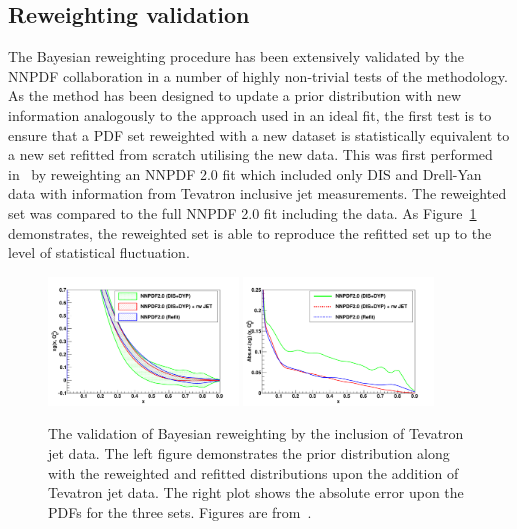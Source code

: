 \subsection{Reweighting validation}
The Bayesian reweighting procedure has been extensively validated by the NNPDF collaboration in a number of highly non-trivial tests of the methodology. As the method has been designed to update a prior distribution with new information analogously to the approach used in an ideal fit, the first test is to ensure that a PDF set reweighted with a new dataset is statistically equivalent to a new set refitted from scratch utilising the new data. This was first performed in~\cite{Ball:2010gb} by reweighting an NNPDF 2.0 fit which included only DIS and Drell-Yan data with information from Tevatron inclusive jet measurements. The reweighted set was compared to the full NNPDF 2.0 fit including the data. As Figure~\ref{fig:rwvalid} demonstrates, the reweighted set is able to reproduce the refitted set up to the level of statistical fluctuation.


\begin{figure}[ht!]
\centering
\includegraphics[width=0.45\textwidth]{4-LHCtools/figs/jets-t0-xg_Q2_2_lin.pdf}
\includegraphics[width=0.45\textwidth]{4-LHCtools/figs/jets-t0-abserror-xg_Q2_2_lin.pdf}
\caption[Validation of Bayesian reweighting by the inclusion of Tevatron jet data]{The validation of Bayesian reweighting by the inclusion of Tevatron jet data. The left figure demonstrates the prior distribution along with the reweighted and refitted distributions upon the addition of Tevatron jet data. The right plot shows the absolute error upon the PDFs for the three sets. Figures are from~\cite{Ball:2010gb}.}
\label{fig:rwvalid}
\end{figure}

